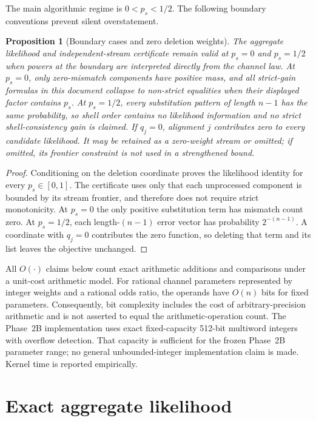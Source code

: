 \documentclass[11pt]{article}
\newtheorem{proposition}[theorem]{Proposition}
\theoremstyle{remark}
\begin{document}
The main algorithmic regime is $0<p_s<1/2$.  The following boundary conventions prevent
silent overstatement.

\begin{proposition}[Boundary cases and zero deletion weights]
The aggregate likelihood and independent-stream certificate remain valid at $p_s=0$ and
$p_s=1/2$ when powers at the boundary are interpreted directly from the channel law.
At $p_s=0$, only zero-mismatch components have positive mass, and all strict-gain formulas
in this document collapse to non-strict equalities when their displayed factor contains
$p_s$.  At $p_s=1/2$, every substitution pattern of length $n-1$ has the same probability,
so shell order contains no likelihood information and no strict shell-consistency gain is
claimed.  If $q_j=0$, alignment $j$ contributes zero to every candidate likelihood.  It may
be retained as a zero-weight stream or omitted; if omitted, its frontier constraint is not
used in a strengthened bound.
\end{proposition}

\begin{proof}
Conditioning on the deletion coordinate proves the likelihood identity for every
$p_s\in[0,1]$.  The certificate uses only that each unprocessed component is bounded by its
stream frontier, and therefore does not require strict monotonicity.  At $p_s=0$ the only
positive substitution term has mismatch count zero.  At $p_s=1/2$, each length-$(n-1)$
error vector has probability $2^{-(n-1)}$.  A coordinate with $q_j=0$ contributes the zero
function, so deleting that term and its list leaves the objective unchanged.
\end{proof}

All $O(\cdot)$ claims below count exact arithmetic additions and comparisons under a
unit-cost arithmetic model.  For rational channel parameters represented by integer
weights and a rational odds ratio, the operands have $O(n)$ bits for fixed parameters.
Consequently, bit complexity includes the cost of arbitrary-precision arithmetic and is
not asserted to equal the arithmetic-operation count.  The Phase~2B implementation uses exact fixed-capacity 512-bit multiword integers
with overflow detection.  That capacity is sufficient for the frozen Phase~2B parameter
range; no general unbounded-integer implementation claim is made.  Kernel time is
reported empirically.

\section{Exact aggregate likelihood}
\end{document}
